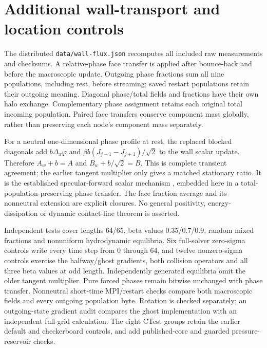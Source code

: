 \documentclass[11pt]{article}
\begin{document}
\section{Additional wall-transport and location controls}
The distributed \texttt{data/wall-flux.json} recomputes all included raw
measurements and checksums. A relative-phase face transfer is applied after
bounce-back and before the macroscopic update. Outgoing phase fractions
sum all nine populations, including rest, before streaming; saved restart
populations retain their outgoing meaning. Diagonal phase/total fields and
fractions have their own halo exchange. Complementary phase assignment
retains each original total incoming population. Paired face transfers
conserve component mass globally, rather than preserving each node's
component mass separately.

For a neutral one-dimensional phase profile at rest, the replaced blocked
diagonals add $b\Delta_x\varphi$ and
$\beta b(J_{j-1}-J_{j+1})/\sqrt{2}$ to the wall scalar update. Therefore
$A_w+b=A$ and $B_w+b/\sqrt{2}=B$. This is complete transient agreement;
the earlier tangent multiplier only gives a matched stationary ratio.
It is the established specular-forward scalar mechanism
\cite{ginzburg2015}, embedded here in a total-population-preserving phase
transfer. The face fraction average and its nonneutral extension are
explicit closures. No general positivity, energy-dissipation or dynamic
contact-line theorem is asserted.

Independent tests cover lengths 64/65, beta values 0.35/0.7/0.9, random
mixed fractions and nonuniform hydrodynamic equilibria. Six full-solver
zero-sigma controls write every time step from 0 through 64, and twelve
nonzero-sigma controls exercise the halfway/ghost gradients, both collision
operators and all three beta values at odd length. Independently generated
equilibria omit the older tangent multiplier. Pure forced phases remain
bitwise unchanged with phase transfer. Nonneutral short-time MPI/restart
checks compare both macroscopic fields and every outgoing population byte.
Rotation is checked separately; an outgoing-state gradient audit compares
the ghost implementation with an independent full-grid calculation.
The eight CTest groups retain the earlier default and checkerboard controls,
and add published-core and guarded pressure-reservoir checks.
\end{document}
